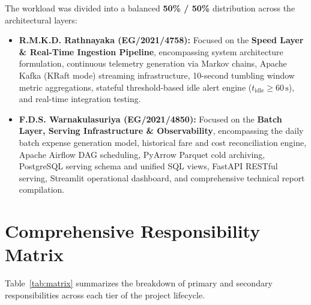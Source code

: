 \documentclass[11pt,a4paper]{article}
\begin{document}
The workload was divided into a balanced \textbf{50\% / 50\%} distribution across the architectural layers:
\begin{itemize}
    \item \textbf{R.M.K.D. Rathnayaka (EG/2021/4758):} Focused on the \textbf{Speed Layer \& Real-Time Ingestion Pipeline}, encompassing system architecture formulation, continuous telemetry generation via Markov chains, Apache Kafka (KRaft mode) streaming infrastructure, 10-second tumbling window metric aggregations, stateful threshold-based idle alert engine ($t_{\text{idle}} \ge 60\,\text{s}$), and real-time integration testing.
    \item \textbf{F.D.S. Warnakulasuriya (EG/2021/4850):} Focused on the \textbf{Batch Layer, Serving Infrastructure \& Observability}, encompassing the daily batch expense generation model, historical fare and cost reconciliation engine, Apache Airflow DAG scheduling, PyArrow Parquet cold archiving, PostgreSQL serving schema and unified SQL views, FastAPI RESTful serving, Streamlit operational dashboard, and comprehensive technical report compilation.
\end{itemize}

\vspace{0.3cm}

\clearpage

\section{Comprehensive Responsibility Matrix}
Table~\ref{tab:matrix} summarizes the breakdown of primary and secondary responsibilities across each tier of the project lifecycle.
\end{document}
